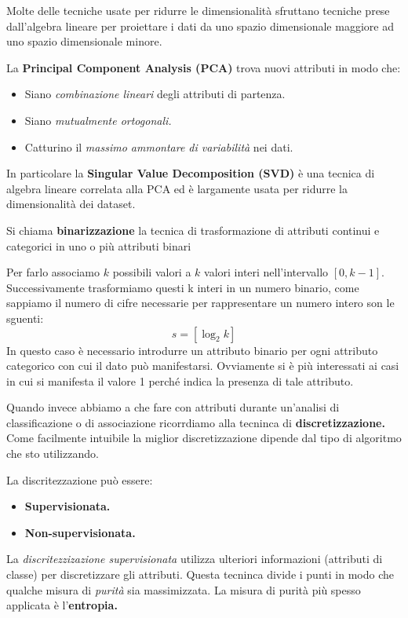 Molte delle tecniche usate per ridurre le dimensionalità sfruttano tecniche prese dall'algebra lineare per proiettare i dati da uno spazio dimensionale maggiore ad uno spazio dimensionale minore.

La \textbf{Principal Component Analysis (PCA)} trova nuovi attributi in modo che:
\begin{itemize}
	\item Siano \textit{combinazione lineari} degli attributi di partenza.
	\item Siano \textit{mutualmente ortogonali.}
	\item Catturino il \textit{massimo ammontare di variabilità} nei dati.
\end{itemize}

In particolare la \textbf{Singular Value Decomposition (SVD)} è una tecnica di algebra lineare correlata alla PCA ed è largamente usata per ridurre la dimensionalità dei dataset.

\begin{defn}
	Si chiama \textbf{binarizzazione} la tecnica di trasformazione di attributi continui e categorici in uno o più attributi binari
\end{defn}
Per farlo associamo $k$ possibili valori a $k$ valori interi nell'intervallo $[0, k-1]$. Successivamente trasformiamo questi k interi in un numero binario, come sappiamo il numero di cifre necessarie per rappresentare un numero intero son le sguenti:
\[s = [\log_{2}k]\] 
 In questo caso è necessario introdurre un attributo binario per ogni attributo categorico con cui il dato può manifestarsi. Ovviamente si è più interessati ai casi in cui si manifesta il valore 1 perché indica la presenza di tale attributo.
 
 Quando invece abbiamo a che fare con attributi durante un'analisi di classificazione o di associazione ricorrdiamo alla tecninca di \textbf{discretizzazione.} Come facilmente intuibile la miglior discretizzazione dipende dal tipo di algoritmo che sto utilizzando.

 La discritezzazione può essere:
 
 \begin{itemize}
 	\item \textbf{Supervisionata.}
 	\item \textbf{Non-supervisionata.}
 \end{itemize}
La \textit{discritezzizazione supervisionata} utilizza ulteriori informazioni (attributi di classe) per discretizzare gli attributi. Questa tecninca divide i punti in modo che qualche misura di \textit{purità} sia massimizzata. La misura di purità più spesso applicata è l'\textbf{entropia.}
 	
